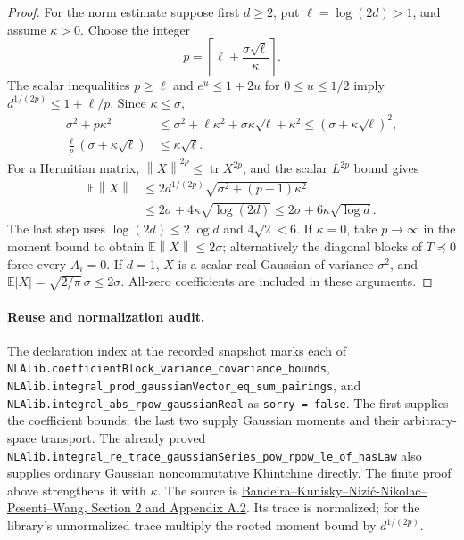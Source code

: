 \documentclass[11pt,a4paper]{article}
\newcommand{\norm}[1]{\left\lVert#1\right\rVert}
\DeclareMathOperator{\tr}{tr}
\DeclareRobustCommand{\code}[1]{{\footnotesize\urlstyle{tt}\nolinkurl{#1}}}
\begin{document}
\begin{proof}
For the norm estimate suppose first $d\geq2$, put
$\ell=\log(2d)>1$, and assume $\kappa>0$.  Choose the integer
\[
              p=\left\lceil\ell+\frac{\sigma\sqrt\ell}{\kappa}
                 \right\rceil.
\]
The scalar inequalities $p\geq\ell$ and $e^u\leq1+2u$ for
$0\leq u\leq1/2$ imply $d^{1/(2p)}\leq1+\ell/p$.
Since $\kappa\leq\sigma$,
\begin{align*}
 \sigma^2+p\kappa^2
 &\leq\sigma^2+\ell\kappa^2+\sigma\kappa\sqrt\ell+\kappa^2
 \leq(\sigma+\kappa\sqrt\ell)^2,\\
 \frac\ell p(\sigma+\kappa\sqrt\ell)&\leq\kappa\sqrt\ell.
\end{align*}
For a Hermitian matrix, $\norm X^{2p}\leq\tr X^{2p}$, and the scalar
$L^{2p}$ bound gives
\begin{align*}
 \mathbb E\norm X
 &\leq2d^{1/(2p)}\sqrt{\sigma^2+(p-1)\kappa^2}\\
 &\leq2\sigma+4\kappa\sqrt{\log(2d)}
 \leq2\sigma+6\kappa\sqrt{\log d}.
\end{align*}
The last step uses $\log(2d)\leq2\log d$ and $4\sqrt2<6$.
If $\kappa=0$, take $p\to\infty$ in the moment bound to obtain
$\mathbb E\norm X\leq2\sigma$; alternatively the diagonal blocks of
$T\preceq0$ force every $A_i=0$.  If $d=1$, $X$ is a scalar real
Gaussian of variance $\sigma^2$, and
$\mathbb E|X|=\sqrt{2/\pi}\,\sigma\leq2\sigma$.
All-zero coefficients are included in these arguments.
\end{proof}

\paragraph{Reuse and normalization audit.}
The declaration index at the recorded snapshot marks each of
\code{NLAlib.coefficientBlock_variance_covariance_bounds},
\code{NLAlib.integral_prod_gaussianVector_eq_sum_pairings}, and
\code{NLAlib.integral_abs_rpow_gaussianReal} as
\code{sorry = false}.  The first supplies the coefficient bounds; the
last two supply Gaussian moments and their arbitrary-space transport.
The already proved
\code{NLAlib.integral_re_trace_gaussianSeries_pow_rpow_le_of_hasLaw}
also supplies ordinary Gaussian noncommutative Khintchine directly.
The finite proof above strengthens it with $\kappa$.
The source is
\href{https://arxiv.org/html/2610.01982v1}{Bandeira--Kunisky--Nizi\'c-Nikolac--Pesenti--Wang,
Section 2 and Appendix A.2}.  Its trace is normalized; for the library's
unnormalized trace multiply the rooted moment bound by $d^{1/(2p)}$.
\end{document}
